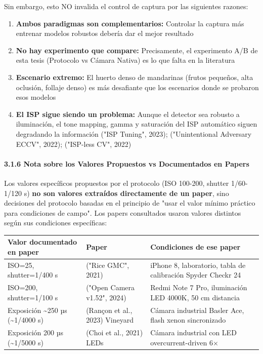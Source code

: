 Sin embargo, esto NO invalida el control de captura por las siguientes razones:


\begin{enumerate}
\item \textbf{Ambos paradigmas son complementarios:} Controlar la captura más entrenar modelos robustos debería dar el mejor resultado
\item \textbf{No hay experimento que compare:} Precisamente, el experimento A/B de esta tesis (Protocolo vs Cámara Nativa) es lo que falta en la literatura
\item \textbf{Escenario extremo:} El huerto denso de mandarinas (frutos pequeños, alta oclusión, follaje denso) es más desafiante que los escenarios donde se probaron esos modelos
\item \textbf{El ISP sigue siendo un problema:} Aunque el detector sea robusto a iluminación, el tone mapping, gamma y saturación del ISP automático siguen degradando la información ("ISP Tuning", 2023); ("Unintentional Adversary ECCV", 2022); ("ISP-less CV", 2022)
\end{enumerate}

\paragraph{3.1.6 Nota sobre los Valores Propuestos vs Documentados en Papers}


Los valores específicos propuestos por el protocolo (ISO 100-200, shutter 1/60-1/120 s) \textbf{no son valores extraídos directamente de un paper}, sino decisiones del protocolo basadas en el principio de "usar el valor mínimo práctico para condiciones de campo". Los papers consultados usaron valores distintos según sus condiciones específicas:



\begin{tabular}{lll}
\hline
Valor documentado en paper & Paper & Condiciones de ese paper \\
\hline
ISO=25, shutter=1/400 s & ("Rice GMC", 2021) & iPhone 8, laboratorio, tabla de calibración Spyder Checkr 24 \\
ISO=200, shutter=1/100 s & ("Open Camera v1.52", 2024) & Redmi Note 7 Pro, iluminación LED 4000K, 50 cm distancia \\
Exposición \textasciitilde{}250 µs (\textasciitilde{}1/4000 s) & (Rançon et al., 2023) Vineyard & Cámara industrial Basler Ace, flash xenon sincronizado \\
Exposición 200 µs (\textasciitilde{}1/5000 s) & (Choi et al., 2021) LEDs & Cámara industrial con LED overcurrent-driven 6× \\
\hline
\end{tabular}


